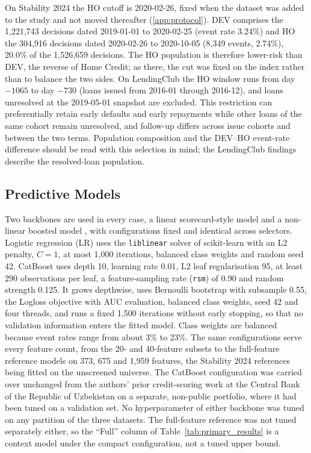 \documentclass[final,5p,twocolumn]{elsarticle}
\begin{document}
On Stability 2024 the HO cutoff is 2020-02-26, fixed when the dataset was added to the study and not moved thereafter (\ref{app:protocol}). DEV comprises the 1,221,743 decisions dated 2019-01-01 to 2020-02-25 (event rate 3.24\%) and HO the 304,916 decisions dated 2020-02-26 to 2020-10-05 (8,349 events, 2.74\%), 20.0\% of the 1,526,659 decisions. The HO population is therefore lower-risk than DEV, the reverse of Home Credit; as there, the cut was fixed on the index rather than to balance the two sides. On LendingClub the HO window runs from day $-1065$ to day $-730$ (loans issued from 2016-01 through 2016-12), and loans unresolved at the 2019-05-01 snapshot are excluded. This restriction can preferentially retain early defaults and early repayments while other loans of the same cohort remain unresolved, and follow-up differs across issue cohorts and between the two terms. Population composition and the DEV--HO event-rate difference should be read with this selection in mind; the LendingClub findings describe the resolved-loan population.

\subsection{Predictive Models}
\label{subsec:models}

Two backbones are used in every case, a linear scorecard-style model and a non-linear boosted model \cite{lessmann2015,gunnarsson2021}, with configurations fixed and identical across selectors. Logistic regression (LR) uses the \texttt{liblinear} solver of scikit-learn \cite{pedregosa2011} with an L2 penalty, $C=1$, at most 1,000 iterations, balanced class weights and random seed 42. CatBoost \cite{prokhorenkova2018} uses depth 10, learning rate 0.01, L2 leaf regularisation 95, at least 290 observations per leaf, a feature-sampling rate (\texttt{rsm}) of 0.90 and random strength 0.125. It grows depthwise, uses Bernoulli bootstrap with subsample 0.55, the Logloss objective with AUC evaluation, balanced class weights, seed 42 and four threads, and runs a fixed 1,500 iterations without early stopping, so that no validation information enters the fitted model. Class weights are balanced because event rates range from about 3\% to 23\%. The same configurations serve every feature count, from the 20- and 40-feature subsets to the full-feature reference models on 373, 675 and 1,959 features, the Stability 2024 references being fitted on the unscreened universe. The CatBoost configuration was carried over unchanged from the authors' prior credit-scoring work at the Central Bank of the Republic of Uzbekistan on a separate, non-public portfolio, where it had been tuned on a validation set. No hyperparameter of either backbone was tuned on any partition of the three datasets. The full-feature reference was not tuned separately either, so the ``Full'' column of Table~\ref{tab:primary_results} is a context model under the compact configuration, not a tuned upper bound.
\end{document}
